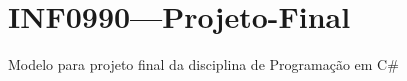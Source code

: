 \chapter{INF0990---Projeto-\/\+Final}
\hypertarget{md__r_e_a_d_m_e}{}\label{md__r_e_a_d_m_e}
\label{md__r_e_a_d_m_e_autotoc_md0}%
%
 Modelo para projeto final da disciplina de Programação em C\# 